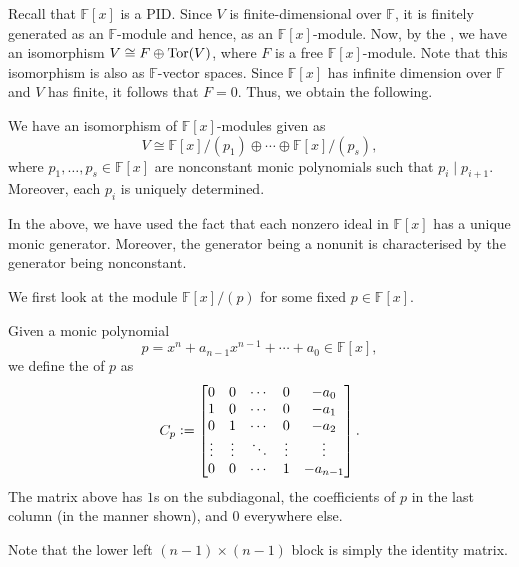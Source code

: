 \documentclass[12pt]{article}
\begin{document}
Recall that $\mathbb{F}[x]$ is a PID. Since $V$ is finite-dimensional over $\mathbb{F}$, it is finitely generated as an $\mathbb{F}$-module and hence, as an $\mathbb{F}[x]$-module. Now, by the , we have an isomorphism $V \cong F \oplus \operatorname{Tor}(V)$, where $F$ is a free $\mathbb{F}[x]$-module. Note that this isomorphism is also as $\mathbb{F}$-vector spaces. Since $\mathbb{F}[x]$ has infinite dimension over $\mathbb{F}$ and $V$ has finite, it follows that $F = 0$. Thus, we obtain the following.

\begin{thm}
	We have an isomorphism of $\mathbb{F}[x]$-modules given as
	\begin{equation} \label{eq:02}
		V \cong \mathbb{F}[x]/(p_{1}) \oplus \cdots \oplus \mathbb{F}[x]/(p_{s}),
	\end{equation}
	where $p_{1}, \ldots, p_{s} \in \mathbb{F}[x]$ are nonconstant monic polynomials such that $p_{i} \mid p_{i + 1}$. Moreover, each $p_{i}$ is uniquely determined.
\end{thm}

In the above, we have used the fact that each nonzero ideal in $\mathbb{F}[x]$ has a unique monic generator. Moreover, the generator being a nonunit is characterised by the generator being nonconstant.

We first look at the module $\mathbb{F}[x]/(p)$ for some fixed $p \in \mathbb{F}[x]$. 

\begin{defn}
	Given a monic polynomial
	\begin{equation*} 
		p = x^{n} + a_{n - 1} x^{n - 1} + \cdots + a_{0} \in \mathbb{F}[x],
	\end{equation*}
	we define the  of $p$ as
	\begin{equation*} 
		C_{p} \vcentcolon= 
		\begin{bmatrix}
			0 & 0 & \cdots & 0 & -a_{0} \\
			1 & 0 & \cdots & 0 & -a_{1} \\
			0 & 1 & \cdots & 0 & -a_{2} \\
			\vdots & \vdots & \ddots & \vdots & \vdots \\
			0 & 0 & \cdots & 1 & -a_{n - 1} \\
		\end{bmatrix}.
	\end{equation*}
	The matrix above has $1$s on the subdiagonal, the coefficients of $p$ in the last column (in the manner shown), and $0$ everywhere else.
\end{defn}
Note that the lower left $(n - 1) \times (n - 1)$ block is simply the identity matrix.
\end{document}
